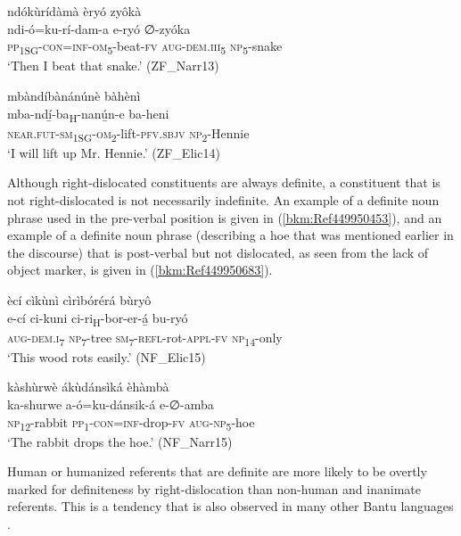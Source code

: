 \ea
\label{bkm:Ref449690548}
ndókùrídàmà èryó zyôkà\\
\gll ndi-ó=ku-rí-dam-a      e-ryó    ∅-zyóka\\
\textsc{pp}\textsubscript{1SG}-\textsc{con}=\textsc{inf}-\textsc{om}\textsubscript{5}-beat-\textsc{fv}  \textsc{aug}-\textsc{dem}.\textsc{iii}\textsubscript{5}  \textsc{np}\textsubscript{5}-snake\\
\glt ‘Then I beat that snake.’ (ZF\_Narr13)
\z

\ea
\label{bkm:Ref449690555}
mbàndíbànánúnè bàhènì\\
\gll mba-ndí̲-ba\textsubscript{H}-nanú̲n-e      ba-heni\\
\textsc{near}.\textsc{fut}-\textsc{sm}\textsubscript{1SG}-\textsc{om}\textsubscript{2}-lift-\textsc{pfv}.\textsc{sbjv}  \textsc{np}\textsubscript{2}-Hennie\\
\glt ‘I will lift up Mr. Hennie.’ (ZF\_Elic14)
\z

Although right-dislocated constituents are always definite, a constituent that is not right-dislocated is not necessarily indefinite. An example of a definite noun phrase used in the pre-verbal position is given in (\ref{bkm:Ref449950453}), and an example of a definite noun phrase (describing a hoe that was mentioned earlier in the discourse) that is post-verbal but not dislocated, as seen from the lack of object marker, is given in (\ref{bkm:Ref449950683}).

\ea
\label{bkm:Ref449950453}
ècí cìkùnì cìrìbórérá bùryô\\
\gll e-cí    ci-kuni  ci-ri\textsubscript{H}-bor-er-á̲    bu-ryó\\
\textsc{aug}-\textsc{dem}.\textsc{i}\textsubscript{7}  \textsc{np}\textsubscript{7}-tree  \textsc{sm}\textsubscript{7}-\textsc{refl}-rot-\textsc{appl}-\textsc{fv}  \textsc{np}\textsubscript{14}-only\\
\glt ‘This wood rots easily.’ (NF\_Elic15)
\z

\ea
\label{bkm:Ref449950683}
kàshùrwè ákùdánsìká èhàmbà\\
\gll ka-shurwe  a-ó=ku-dánsik-á    e-∅-amba\\
\textsc{np}\textsubscript{12}-rabbit  \textsc{pp}\textsubscript{1}-\textsc{con}=\textsc{inf}-drop-\textsc{fv}  \textsc{aug}-\textsc{np}\textsubscript{5}-hoe\\
\glt ‘The rabbit drops the hoe.’ (NF\_Narr15)
\z

Human or humanized referents that are definite are more likely to be overtly marked for definiteness by right-dislocation than non-human and inanimate referents. This is a tendency that is also observed in many other Bantu languages \citep{Riedel2009}.

